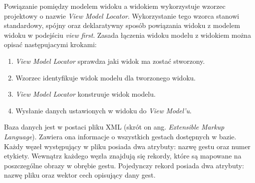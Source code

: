 Powiązanie pomiędzy modelem widoku a widokiem wykorzystuje wzorzec projektowy o nazwie \textit{View Model Locator}. Wykorzystanie tego wzorca stanowi standardowy, spójny oraz deklaratywny sposób powiązania widoku z modelem widoku  w podejściu \textit{view first}. Zasada łączenia widoku modelu z widokiem można opisać następujacymi krokami:
\begin{enumerate}
	\item \textit{View Model Locator} sprawdza jaki widok ma zostać stworzony.
	\item Wzorzec identyfikuje widok modelu dla  tworzonego widoku.
	\item \textit{View Model Locator} konstruuje widok modelu.
	\item Wysłanie danych ustawionych w widoku do \textit{View Model'u}.
\end{enumerate}

Baza danych jest w postaci pliku XML (skrót on ang. \textit{Extensible Markup Language}). Zawiera ona informacje o wszystkich gestach dostępnych w bazie. Każdy węzeł występujący w pliku posiada dwa atrybuty: nazwę gestu oraz numer etykiety. Wewnątrz każdego węzła znajdują się rekordy, które są mapowane na  poszczególne obrazy w obrębie gestu. Pojedynczy rekord posiada dwa atrybuty: nazwę pliku oraz wektor cech opisujący dany gest.

